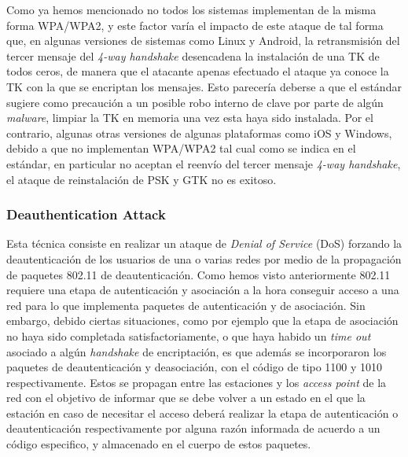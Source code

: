 \documentclass[10pt,a4paper]{article}
\begin{document}
Como ya hemos mencionado no todos los sistemas implementan de la misma forma WPA/WPA2, y este factor varía el impacto de este ataque de tal forma que, en algunas versiones de sistemas como Linux y Android, la retransmisión del tercer mensaje del \textit{4-way handshake} desencadena la instalación de una TK de todos ceros, de manera que el atacante apenas efectuado el ataque ya conoce la TK con la que se encriptan los mensajes. Esto parecería deberse a que el estándar sugiere como precaución a un posible robo interno de clave por parte de algún \textit{malware}, limpiar la TK en memoria una vez esta haya sido instalada. Por el contrario, algunas otras versiones de algunas plataformas como iOS y Windows, debido a que no implementan WPA/WPA2 tal cual como se indica en el estándar, en particular no aceptan el reenvío del tercer mensaje \textit{4-way handshake}, el ataque de reinstalación de PSK y GTK no es exitoso.




\subsubsection{Deauthentication Attack}

Esta técnica consiste en realizar un ataque de \textit{Denial of Service} (DoS) forzando la deautenticación de los usuarios de una o varias redes por medio de la propagación de paquetes 802.11 de deautenticación. Como hemos visto anteriormente 802.11 requiere una etapa de autenticación y asociación a la hora conseguir acceso a una red para lo que implementa paquetes de autenticación y de asociación. Sin embargo, debido ciertas situaciones, como por ejemplo que la etapa de asociación no haya sido completada satisfactoriamente, o que haya habido un \textit{time out} asociado a algún \textit{handshake} de encriptación, es que además se incorporaron los paquetes de deautenticación y deasociación, con el código de tipo 1100 y 1010 respectivamente. Estos se propagan entre las estaciones y los \textit{access point} de la red con el objetivo de informar que se debe volver a un estado en el que la estación en caso de necesitar el acceso deberá realizar la etapa de autenticación o deautenticación respectivamente por alguna razón informada de acuerdo a un código especifico, y almacenado en el cuerpo de estos paquetes.
\end{document}
